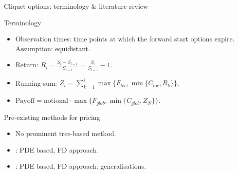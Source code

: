 \documentclass[utf8,t,xcolor=svgnames]{beamer}
\begin{document}
\begin{frame}{Cliquet options: terminology \& literature review}
	\begin{block}{Terminology}
		\begin{itemize}
			\item Observation times: time points at which the forward start options expire. Assumption: equidistant.
			\item Return: $ R_i = \frac{S_i - S_{i-1}}{S_{i-1}} = \frac{S_i}{S_{i-1}} - 1 $.
			\item Running sum: $ Z_i = \sum_{k = 1}^{i} \max \{ F_{loc}, \min \{ C_{loc}, R_k \} \} $.
			\item $ \mathrm{Payoff} = \mathrm{notional} \cdot \max \{ F_{glob}, \min \{ C_{glob}, Z_{N} \} \} $.
		\end{itemize}
	\end{block}	
	\begin{block}{Pre-existing methods for pricing}
		\begin{itemize}
			\item No prominent tree-based method.
			\item \cite{Wilmott2002}: PDE based, FD approach.
			\item \cite{Windcliff2006}: PDE based, FD approach; generalisations.
		\end{itemize}
	\end{block}
\end{frame}
\end{document}
